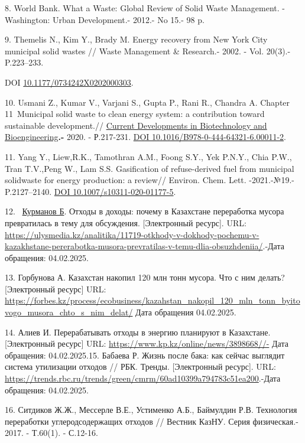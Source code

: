 \begin{references}
8. World Bank. What a Waste: Global Review of Solid Waste Management.
-Washington: Urban Development.- 2012.- No 15.- 98 p.

9. Themelis N., Kim Y., Brady M. Energy recovery from New York City
municipal solid wastes // Waste Management \& Research.- 2002. - Vol.
20(3).- P.223--233.

DOI
\href{http://dx.doi.org/10.1177/0734242X0202000303}{10.1177/0734242X0202000303}.

10. Usmani Z., Kumar V., Varjani S., Gupta P., Rani R., Chandra A.
Chapter 11~Municipal solid waste to clean energy system: a
contribution toward sustainable development.//
\href{https://www.sciencedirect.com/book/9780444643216/current-developments-in-biotechnology-and-bioengineering}{Current
Developments in Biotechnology and Bioengineering}{\bfseries .-} 2020. -
Р.217-231. \href{https://doi.org/10.1016/B978-0-444-64321-6.00011-2}{DOI
10.1016/B978-0-444-64321-6.00011-2}.

11. Yang Y., Liew,R.K., Tamothran A.M., Foong S.Y., Yek P.N.Y., Chia
P.W., Tran T.V.,Peng W., Lam S.S. Gasification of refuse-derived fuel
from municipal solidwaste for energy production: a review// Environ.
Chem. Lett. -2021.-№19.- P.2127--2140.
\href{https://doi.org/10.1007/s10311-020-01177-5}{DOI
10.1007/s10311-020-01177-5}.

12. ~\href{https://ulysmedia.kz/author/21/}{Курманов Б}. Отходы в
доходы: почему в Казахстане переработка мусора превратилась в тему для
обсуждения. {[}Электронный ресурс{]}. URL:
\url{https://ulysmedia.kz/analitika/11719-otkhody-v-dokhody-pochemu-v-kazakhstane-pererabotka-musora-prevratilas-v-temu-dlia-obsuzhdeniia/}.-Дата
обращения: 04.02.2025.

13. Горбунова А. Казахстан накопил 120 млн тонн мусора. Что с ним
делать? {[}Электронный ресурс{]} URL:
\url{https://forbes.kz/process/ecobusiness/kazahstan_nakopil_120_mln_tonn_byitovogo_musora_chto_s_nim_delat/}
Дата обращения 04.02.2025.

14. Алиев И. Перерабатывать отходы в энергию планируют в Казахстане.
{[}Электронный ресурс{]} URL:
\url{https://www.kp.kz/online/news/3898668//-} Дата обращения:
04.02.2025.15. Бабаева Р. Жизнь после бака: как сейчас выглядит система утилизации
отходов // РБК. Тренды. {[}Электронный ресурс{]}. URL:
\url{https://trends.rbc.ru/trends/green/cmrm/60ad10399a794783c51ea200}.-Дата
обращения: 04.02.2025.

16. Ситдиков Ж.Ж., Мессерле В.Е., Устименко А.Б., Баймулдин Р.В.
Технология переработки углеродсодержащих отходов // Вестник КазНУ. Серия
физическая.- 2017. - Т.60(1). - С.12-16.


\end{references}
